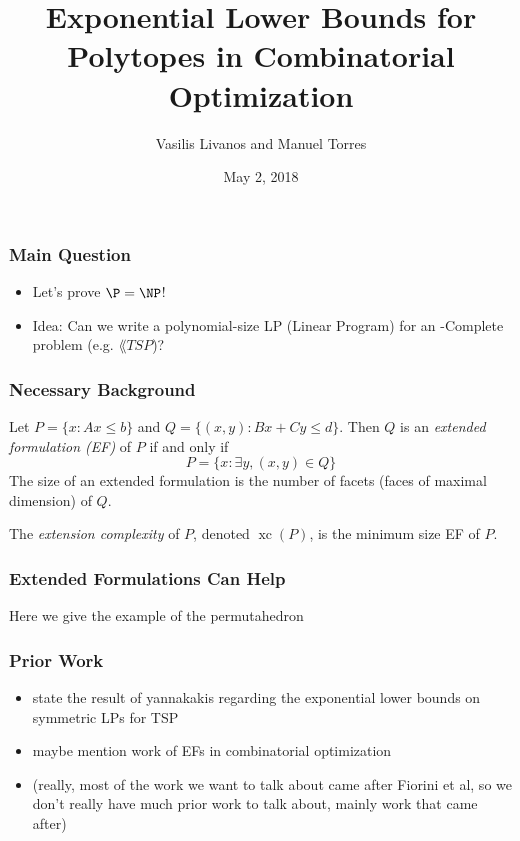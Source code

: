 \documentclass{beamer}
\author[Livanos, Torres]{Vasilis Livanos and Manuel Torres}
\title[Exp. Lower Bounds for Polytopes]{Exponential Lower Bounds for Polytopes in Combinatorial Optimization}
\institute[UIUC]{University of Illinois at Urbana-Champaign}
\date{May 2, 2018}
\newcommand{\xc}{\operatorname{xc}}
\begin{document}
\begin{frame}
\titlepage
\end{frame}


\begin{frame}
\frametitle{Main Question}

\pause
\begin{itemize}
\item Let's prove $\P = \NP$!
\pause
\item Idea: Can we write a polynomial-size LP (Linear Program) for an \NP-Complete problem (e.g. $\lang{TSP}$)?
\end{itemize}
\end{frame}


\begin{frame}
\frametitle{Necessary Background}

\pause
\begin{definition}
Let $P = \{x : Ax \leq b\}$ and $Q = \{(x,y) : Bx + Cy \leq d\}$. Then $Q$ is an \emph{extended formulation (EF)} of $P$ if and only if
\[
P = \{x : \exists y , (x,y) \in Q\}
\]
The size of an extended formulation is the number of facets (faces of maximal dimension) of $Q$.
\end{definition}

\pause
\begin{definition}
The \emph{extension complexity} of $P$, denoted $\xc(P)$, is the minimum size EF of $P$.
\end{definition}

\end{frame}


\begin{frame}
\frametitle{Extended Formulations Can Help}
Here we give the example of the permutahedron
\end{frame}


\begin{frame}
\frametitle{Prior Work}

\begin{itemize}
\item state the result of yannakakis regarding the exponential lower bounds on symmetric LPs for TSP
\item maybe mention work of EFs in combinatorial optimization
\item (really, most of the work we want to talk about came after Fiorini et al, so we don't really have much prior work to talk about, mainly work that came after)
\end{itemize}

\end{frame}
\end{document}

